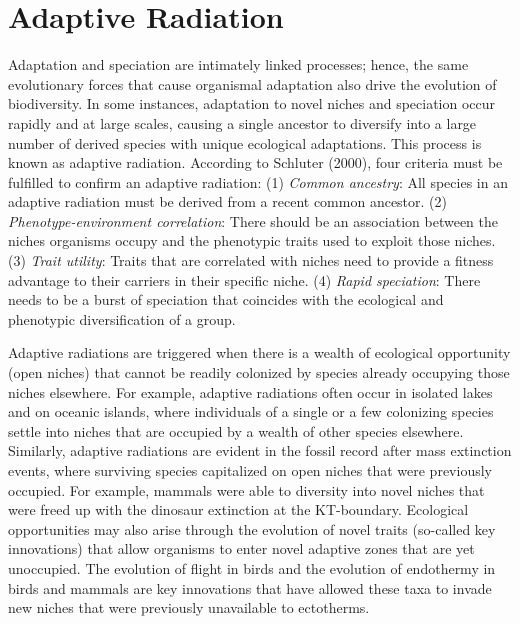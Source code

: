 \documentclass[
]{book}
\begin{document}
\hypertarget{adaptive-radiation}{%
\section{Adaptive Radiation}\label{adaptive-radiation}}

Adaptation and speciation are intimately linked processes; hence, the same evolutionary forces that cause organismal adaptation also drive the evolution of biodiversity. In some instances, adaptation to novel niches and speciation occur rapidly and at large scales, causing a single ancestor to diversify into a large number of derived species with unique ecological adaptations. This process is known as adaptive radiation. According to Schluter (2000), four criteria must be fulfilled to confirm an adaptive radiation: (1) \emph{Common ancestry}: All species in an adaptive radiation must be derived from a recent common ancestor. (2) \emph{Phenotype-environment correlation}: There should be an association between the niches organisms occupy and the phenotypic traits used to exploit those niches. (3) \emph{Trait utility}: Traits that are correlated with niches need to provide a fitness advantage to their carriers in their specific niche. (4) \emph{Rapid speciation}: There needs to be a burst of speciation that coincides with the ecological and phenotypic diversification of a group.

Adaptive radiations are triggered when there is a wealth of ecological opportunity (open niches) that cannot be readily colonized by species already occupying those niches elsewhere. For example, adaptive radiations often occur in isolated lakes and on oceanic islands, where individuals of a single or a few colonizing species settle into niches that are occupied by a wealth of other species elsewhere. Similarly, adaptive radiations are evident in the fossil record after mass extinction events, where surviving species capitalized on open niches that were previously occupied. For example, mammals were able to diversity into novel niches that were freed up with the dinosaur extinction at the KT-boundary. Ecological opportunities may also arise through the evolution of novel traits (so-called key innovations) that allow organisms to enter novel adaptive zones that are yet unoccupied. The evolution of flight in birds and the evolution of endothermy in birds and mammals are key innovations that have allowed these taxa to invade new niches that were previously unavailable to ectotherms.
\end{document}
